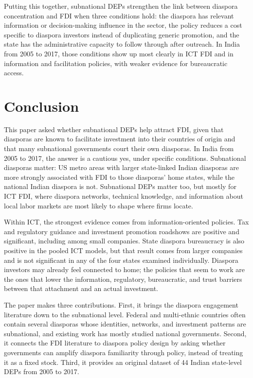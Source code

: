 \documentclass[12pt]{article}
\begin{document}
Putting this together, subnational DEPs strengthen the link between diaspora concentration and FDI when three conditions hold: the diaspora has relevant information or decision-making influence in the sector, the policy reduces a cost specific to diaspora investors instead of duplicating generic promotion, and the state has the administrative capacity to follow through after outreach. In India from 2005 to 2017, those conditions show up most clearly in ICT FDI and in information and facilitation policies, with weaker evidence for bureaucratic access.

\section{Conclusion} \label{sec:conclusion}

This paper asked whether subnational DEPs help attract FDI, given that diasporas are known to facilitate investment into their countries of origin and that many subnational governments court their own diasporas. In India from 2005 to 2017, the answer is a cautious yes, under specific conditions. Subnational diasporas matter: US metro areas with larger state-linked Indian diasporas are more strongly associated with FDI to those diasporas' home states, while the national Indian diaspora is not. Subnational DEPs matter too, but mostly for ICT FDI, where diaspora networks, technical knowledge, and information about local labor markets are most likely to shape where firms locate.

Within ICT, the strongest evidence comes from information-oriented policies. Tax and regulatory guidance and investment promotion roadshows are positive and significant, including among small companies. State diaspora bureaucracy is also positive in the pooled ICT models, but that result comes from larger companies and is not significant in any of the four states examined individually. Diaspora investors may already feel connected to home; the policies that seem to work are the ones that lower the information, regulatory, bureaucratic, and trust barriers between that attachment and an actual investment.

The paper makes three contributions. First, it brings the diaspora engagement literature down to the subnational level. Federal and multi-ethnic countries often contain several diasporas whose identities, networks, and investment patterns are subnational, and existing work has mostly studied national governments. Second, it connects the FDI literature to diaspora policy design by asking whether governments can amplify diaspora familiarity through policy, instead of treating it as a fixed stock. Third, it provides an original dataset of 44 Indian state-level DEPs from 2005 to 2017.
\end{document}
